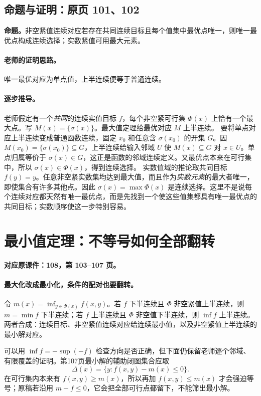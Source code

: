 \documentclass[11pt,a4paper]{article}
\theoremstyle{definition}\newtheorem{definition}{定义}\newtheorem{example}{例}
\begin{document}
\subsection{命题与证明：原页 101、102}

\textbf{命题。}非空紧值连续对应若存在共同连续目标且每个值集中最优点唯一，则唯一最优点构成连续选择；实数紧值可用最大元素。

\paragraph{老师的证明思路。}唯一最优对应为单点值，上半连续便等于普通连续。

\paragraph{逐步推导。}
老师假定有一个\emph{共同}的连续实值目标 $f$，每个非空紧可行集 $\Phi(x)$ 上恰有一个最大点。写 $M(x)=\{\sigma(x)\}$。最大值定理给最优对应 $M$ 上半连续。
要将单点对应上半连续变成普通函数连续，固定 $x_0$ 和任意含 $\sigma(x_0)$ 的开集 $G$。因 $M(x_0)=\{\sigma(x_0)\}\subseteq G$，上半连续给输入邻域 $U$ 使 $M(x)\subseteq G$ 对 $x\in U$。单点归属等价于 $\sigma(x)\in G$，这正是函数的邻域连续定义。又最优点本来在可行集中，所以 $\sigma(x)\in\Phi(x)$，得到连续选择。
实数值域的推论取共同目标 $f(y)=y$。任意非空紧实数集均达到最大值，而且作为\emph{实数元素}的最大者唯一，即使集合有许多其他点。因此 $\sigma(x)=\max\Phi(x)$ 是连续选择。这里不是说每个连续对应都天然有唯一最优点，而是先找到一个使这些值集都具有唯一最优点的共同目标；实数顺序使这一步特别容易。


\clearpage\section{最小值定理：不等号如何全部翻转}\label{g:108:103}

\textbf{对应原课件：108，第 103--107 页。}


\paragraph{最大化改成最小化，条件的配对也要翻转。}
令 $m(x)=\inf_{y\in\Phi(x)}f(x,y)$。若 $f$ 下半连续且 $\Phi$ 非空紧值上半连续，则 $m=\min f$ 下半连续；若 $f$ 上半连续且 $\Phi$ 非空值下半连续，则 $\inf f$ 上半连续。两者合成：连续目标、非空紧值连续对应给连续最小值，以及非空紧值上半连续的最小解对应。

可以用 $\inf f=-\sup(-f)$ 检查方向是否正确，但下面仍保留老师逐个邻域、有限覆盖的证明。第107页最小解的辅助闭图集合应取
\[\Delta(x)=\{y:f(x,y)-m(x)\le0\}.
\]
在可行集内本来有 $f(x,y)\ge m(x)$，所以再加 $f(x,y)\le m(x)$ 才会强迫等号；原稿若沿用 $m-f\le0$，它会把全部可行点都留下，不能筛出最小解。
\end{document}

